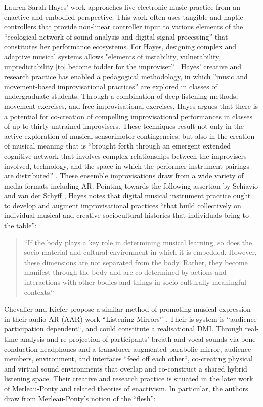 Lauren Sarah Hayes’ work approaches live electronic music practice from an enactive and embodied perspective. This work often uses tangible and haptic controllers that provide non-linear controller input to various elements of the “ecological network of sound analysis and digital signal processing” that constitutes her performance ecosystems. For Hayes, designing complex and adaptive musical systems allows "elements of instability, vulnerability, unpredictability [to] become fodder for the improviser” \citep[p. 2]{hayes2018}. Hayes’ creative and research practice has enabled a pedagogical methodology, in which ”music and movement-based improvisational practices” are explored in classes of undergraduate students. Through a combination of deep listening methods, movement exercises, and free improvisational exercises, Hayes argues that there is a potential for co-creation of compelling improvisational performances in classes of up to thirty untrained improvisers. These techniques result not only in the active exploration of musical sensorimotor contingencies, but also in the creation of musical meaning that is “brought forth through an emergent extended cognitive network that involves complex relationships between the improvisers involved, technology, and the space in which the performer-instrument pairings are distributed” \citep[p. 8]{hayes2019}. These ensemble improvisations draw from a wide variety of media formats including AR. Pointing towards the following assertion by Schiavio and van der Schyff \citeyearpar{schiavio2018}, Hayes notes that digital musical instrument practice ought to develop and augment improvisational practices “that build collectively on individual musical and creative sociocultural histories that individuals bring to the table”:
\begin{quote}
    “If the body plays a key role in determining musical learning, so does the socio-material and cultural environment in which it is embedded. However, these dimensions are not separated from the body. Rather, they become manifest through the body and are co-determined by actions and interactions with other bodies and things in socio-culturally meaningful contexts.“ \citep[p. 9]{hayes2018}
\end{quote}
Chevalier and Kiefer propose a similar method of promoting musical expression in their audio AR (AAR) work “Listening Mirrors” \citeyearpar[]{chevalier2018}. Their is system is “audience participation dependent“, and could constitute a realisational DMI. Through real-time analysis and re-projection of participants’ breath and vocal sounds via bone-conduction headphones and a transducer-augmented parabolic mirror, audience members, environment, and interfaces “feed off each other“, co-creating physical and virtual sound environments that overlap and co-construct a shared hybrid listening space. Their creative and research practice is situated in the later work of Merleau-Ponty and related theories of enactivism. In particular, the authors draw from Merleau-Ponty’s notion of the “flesh”:
